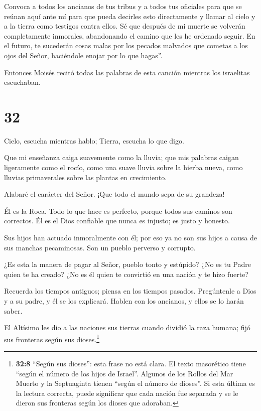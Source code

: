  Convoca a todos los ancianos de tus tribus y a todos tus
oficiales para que se reúnan aquí ante mí para que pueda decirles esto
directamente y llamar al cielo y a la tierra como testigos contra ellos.
 Sé que después de mi muerte se volverán completamente
inmorales, abandonando el camino que les he ordenado seguir. En el
futuro, te sucederán cosas malas por los pecados malvados que cometas a
los ojos del Señor, haciéndole enojar por lo que hagas''.

 Entonces Moisés recitó todas las palabras de esta canción
mientras los israelitas escuchaban.

\hypertarget{section-31}{%
\section{32}\label{section-31}}

 Cielo, escucha mientras hablo; Tierra, escucha lo que digo.

 Que mi enseñanza caiga suavemente como la lluvia; que mis
palabras caigan ligeramente como el rocío, como una suave lluvia sobre
la hierba nueva, como lluvias primaverales sobre las plantas en
crecimiento.

 Alabaré el carácter del Señor. ¡Que todo el mundo sepa de
su grandeza!

 Él es la Roca. Todo lo que hace es perfecto, porque todos
sus caminos son correctos. Él es el Dios confiable que nunca es injusto;
es justo y honesto.

 Sus hijos han actuado inmoralmente con él; por eso ya no
son sus hijos a causa de sus manchas pecaminosas. Son un pueblo perverso
y corrupto.

 ¿Es esta la manera de pagar al Señor, pueblo tonto y
estúpido? ¿No es tu Padre quien te ha creado? ¿No es él quien te
convirtió en una nación y te hizo fuerte?

 Recuerda los tiempos antiguos; piensa en los tiempos
pasados. Pregúntenle a Dios y a su padre, y él se los explicará. Hablen
con los ancianos, y ellos se lo harán saber.

 El Altísimo les dio a las naciones sus tierras cuando
dividió la raza humana; fijó sus fronteras según sus dioses.\footnote{\textbf{32:8}
  ``Según sus dioses'': esta frase no está clara. El texto masorético
  tiene ``según el número de los hijos de Israel''. Algunos de los
  Rollos del Mar Muerto y la Septuaginta tienen ``según el número de
  dioses''. Si esta última es la lectura correcta, puede significar que
  cada nación fue separada y se le dieron sus fronteras según los dioses
  que adoraban.}


